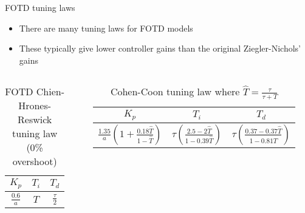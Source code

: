 \documentclass{beamer-control}
\begin{document}
\begin{frame}{FOTD tuning laws}
\begin{itemize}
	\item There are many tuning laws for FOTD models
	\item These typically give lower controller gains than the original Ziegler-Nichols' gains
\end{itemize}

\begin{columns}
\begin{column}{0.4\textwidth}
	\begin{table}
	\centering
	\begin{tabular}{|c|c|c|}
		\hline
		$K_p$ & $T_i$ & $T_d$\\
		\hline
		$\frac{0.6}{a}$ & $T$ & $\frac{\tau}{2}$\\
		\hline	
	\end{tabular}
	\caption{FOTD Chien-Hrones-Reswick tuning law (0\% overshoot)}
\end{table}
\end{column}

\begin{column}{0.6\textwidth}
			
\begin{table}
	\centering
	\begin{tabular}{|c|c|c|}
		\hline
		$K_p$ & $T_i$ & $T_d$\\
		\hline
		\tiny{$\frac{1.35}{a}\left(1 + \frac{0.18 \hat{T}}{1-\hat{T}} \right)$} & \tiny{$ \tau\left( \frac{2.5-2\hat{T}}{1-0.39\hat{T}} \right) $} & \tiny{$\tau \left( \frac{0.37-0.37\hat{T}}{1-0.81\hat{T}} \right)$}\\
		\hline	
	\end{tabular}
	\caption{Cohen-Coon tuning law where $\hat{T}=\frac{\tau}{\tau+T}$}
\end{table}
\end{column}
\end{columns}


\end{frame}


\end{document}
